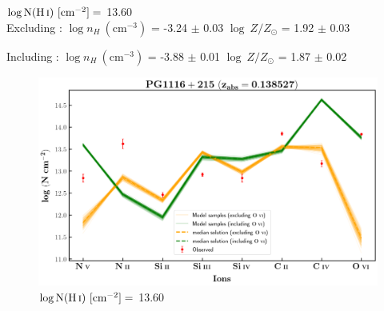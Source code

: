   $\log \text{N}(\ion{H}{i}) \ [\text{cm}^{-2}]=$ 13.60   \\ 
  
  Excluding  : $\log n_H \ (\text{cm}^{-3})$ = -3.24 $\pm$ 0.03 \hspace{10mm} $\log \ Z/Z_\odot$ = 1.92 $\pm$ 0.03
  
  Including  : $\log n_H \ (\text{cm}^{-3})$ = -3.88 $\pm$ 0.01 \hspace{10mm} $\log \ Z/Z_\odot$ = 1.87 $\pm$ 0.02 \\
  
  
  
  \begin{figure}[!h]
      \centering
      \includegraphics[width=0.9\linewidth]{Ionisation-Modelling-Plots/pg1116-z=0.138527-compII_logZ=-1.png}
      \caption{$\log \text{N}(\ion{H}{i}) \ [\text{cm}^{-2}]=$ 13.60}
  \end{figure}
  
  \restoregeometry
  
  \newpage
  \thispagestyle{empty}

